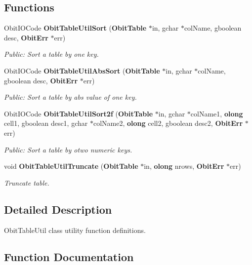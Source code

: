 \subsection*{Functions}
\begin{CompactItemize}
\item 
Obit\-IOCode {\bf Obit\-Table\-Util\-Sort} ({\bf Obit\-Table} $\ast$in, gchar $\ast$col\-Name, gboolean desc, {\bf Obit\-Err} $\ast$err)
\begin{CompactList}\small\item\em Public: Sort a table by one key. \item\end{CompactList}\item 
Obit\-IOCode {\bf Obit\-Table\-Util\-Abs\-Sort} ({\bf Obit\-Table} $\ast$in, gchar $\ast$col\-Name, gboolean desc, {\bf Obit\-Err} $\ast$err)
\begin{CompactList}\small\item\em Public: Sort a table by abs value of one key. \item\end{CompactList}\item 
Obit\-IOCode {\bf Obit\-Table\-Util\-Sort2f} ({\bf Obit\-Table} $\ast$in, gchar $\ast$col\-Name1, {\bf olong} cell1, gboolean desc1, gchar $\ast$col\-Name2, {\bf olong} cell2, gboolean desc2, {\bf Obit\-Err} $\ast$err)
\begin{CompactList}\small\item\em Public: Sort a table by otwo numeric keys. \item\end{CompactList}\item 
void {\bf Obit\-Table\-Util\-Truncate} ({\bf Obit\-Table} $\ast$in, {\bf olong} nrows, {\bf Obit\-Err} $\ast$err)
\begin{CompactList}\small\item\em Truncate table. \item\end{CompactList}\end{CompactItemize}


\subsection{Detailed Description}
Obit\-Table\-Util class utility function definitions. 



\subsection{Function Documentation}

